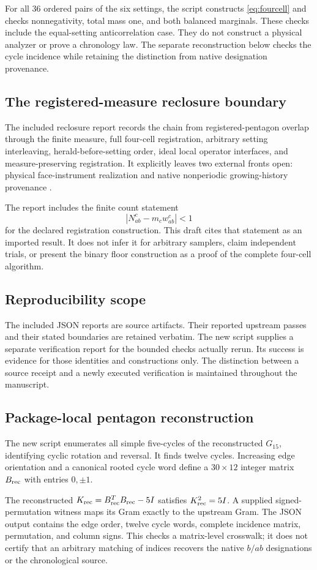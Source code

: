 For all 36 ordered pairs of the six settings, the script constructs \eqref{eq:fourcell} and checks nonnegativity, total mass one, and both balanced marginals. These checks include the equal-setting anticorrelation case. They do not construct a physical analyzer or prove a chronology law. The separate reconstruction below checks the cycle incidence while retaining the distinction from native designation provenance.

\subsection{The registered-measure reclosure boundary}
The included reclosure report records the chain from registered-pentagon overlap through the finite measure, full four-cell registration, arbitrary setting interleaving, herald-before-setting order, ideal local operator interfaces, and measure-preserving registration. It explicitly leaves two external fronts open: physical face-instrument realization and native nonperiodic growing-history provenance \cite{measurereclosure}.

The report includes the finite count statement
\[
|N_{ab}^c-m_cw_{ab}^c|<1
\]
for the declared registration construction. This draft cites that statement as an imported result. It does not infer it for arbitrary samplers, claim independent trials, or present the binary floor construction as a proof of the complete four-cell algorithm.

\subsection{Reproducibility scope}
The included JSON reports are source artifacts. Their reported upstream passes and their stated boundaries are retained verbatim. The new script supplies a separate verification report for the bounded checks actually rerun. Its success is evidence for those identities and constructions only. The distinction between a source receipt and a newly executed verification is maintained throughout the manuscript.

\subsection{Package-local pentagon reconstruction}
The new script  enumerates all simple five-cycles of the reconstructed $G_{15}$, identifying cyclic rotation and reversal. It finds twelve cycles. Increasing edge orientation and a canonical rooted cycle word define a $30\times12$ integer matrix $B_{\rm rec}$ with entries $0,\pm1$.

The reconstructed $K_{\rm rec}=B_{\rm rec}^{T}B_{\rm rec}-5I$ satisfies $K_{\rm rec}^2=5I$. A supplied signed-permutation witness maps its Gram exactly to the upstream Gram. The JSON output contains the edge order, twelve cycle words, complete incidence matrix, permutation, and column signs. This checks a matrix-level crosswalk; it does not certify that an arbitrary matching of indices recovers the native $b/ab$ designations or the chronological source.
